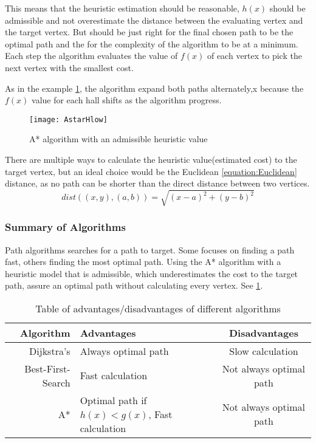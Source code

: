   This means that the heuristic estimation should be reasonable, $h(x)$ should be admissible and not overestimate the distance between the evaluating vertex and the target vertex. But should be just right for the final chosen path to be the optimal path and the for the complexity of the algorithm to be at a minimum. Each step the algorithm evaluates the value of $f(x)$ of each vertex to pick the next vertex with the smallest cost.

  As in the example \cref{astar}, the algorithm expand both paths alternately,x because the $f(x)$ value for each hall shifts as the algorithm progress. 

  \begin{figure}[ht!]
    \centering
    \texttt{[image: AstarHlow]}
    \caption{A* algorithm with an admissible heuristic value}
    \label{astar}
  \end{figure}

  There are multiple ways to calculate the heuristic value(estimated cost) to the target vertex, but an ideal choice would be the Euclidean \cref{equation:Euclidean} distance, as no path can be shorter than the direct distance between two vertices.
  \begin{equation} \label{equation:Euclidean}
    dist((x, y), (a, b)) = \sqrt{(x - a)^2 + (y - b)^2}
  \end{equation}

  \subsubsection{Summary of Algorithms}

  Path algorithms searches for a path to target. Some focuses on finding a path fast, others finding the most optimal path. Using the A* algorithm with a heuristic model that is admissible, which underestimates the cost to the target path, assure an optimal path without calculating every vertex. See \cref{tbl:scheme}.
  
  \begin{table}[ht!]
    \centering
    \begin{tabular}{|r|l|c|}

      \hline
      \textbf{Algorithm} & \textbf{Advantages} & \textbf{Disadvantages} \\
      \hline
      Dijkstra's & Always optimal path & Slow calculation \\
      Best-First-Search & Fast calculation & Not always optimal path \\
      A* & Optimal path if $h(x)<g(x)$, Fast calculation & Not always optimal path \\
      \hline
    \end{tabular}
    \caption{Table of advantages/disadvantages of different algorithms}
    \label{tbl:scheme}
  \end{table}
